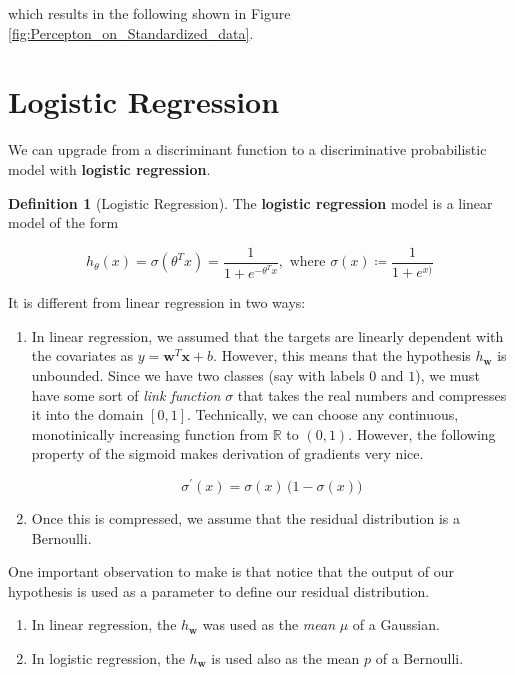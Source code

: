 \documentclass{article}
\theoremstyle{definition}
\newtheorem{definition}{Definition}[section]
\begin{document}
  which results in the following shown in Figure \ref{fig:Percepton_on_Standardized_data}. 

\section{Logistic Regression}

  We can upgrade from a discriminant function to a discriminative probabilistic model with \textbf{logistic regression}. 

  \begin{definition}[Logistic Regression]
  The \textbf{logistic regression} model is a linear model of the form 

    \[h_\theta (x) = \sigma (\theta^T x) = \frac{1}{1 + e^{- \theta^T x}}, \text{ where } \sigma(x) \coloneqq \frac{1}{1 + e^{x)}}\]

  It is different from linear regression in two ways: 

  \begin{enumerate}
    \item In linear regression, we assumed that the targets are linearly dependent with the covariates as $y = \mathbf{w}^T \mathbf{x} + b$. However, this means that the hypothesis $h_\mathbf{w}$ is unbounded. Since we have two classes (say with labels $0$ and $1$), we must have some sort of \textit{link function} $\sigma$ that takes the real numbers and compresses it into the domain $[0, 1]$. Technically, we can choose any continuous, monotinically increasing function from $\mathbb{R}$ to $(0, 1)$. However, the following property of the sigmoid makes derivation of gradients very nice. 

      \[\sigma^\prime (x) = \sigma(x) \, \big(1 - \sigma(x) \big)\]

    \item Once this is compressed, we assume that the residual distribution is a Bernoulli. 
  \end{enumerate}
  \end{definition}

  One important observation to make is that notice that the output of our hypothesis is used as a parameter to define our residual distribution. 

  \begin{enumerate}
    \item In linear regression, the $h_\mathbf{w}$ was used as the \textit{mean} $\mu$ of a Gaussian. 
    \item In logistic regression, the $h_\mathbf{w}$ is used also as the mean $p$ of a Bernoulli. 
  \end{enumerate}
\end{document}
